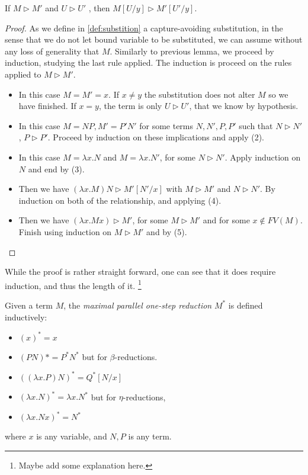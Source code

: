 \begin{lemma}If $M \triangleright M'$ and $U \triangleright U'$ , then $M [U/y] \triangleright M' [U' /y]$.
\end{lemma}
\begin{proof}
As we define in \ref{def:substition} a capture-avoiding substitution, in the sense that we do not let bound variable to be substituted, we can assume without any loss of generality that $M$. Similarly to previous lemma, we proceed by induction, studying the last rule applied. The induction is proceed on the rules applied to $M\triangleright M'$.

\begin{itemize}
    \item[(1)] In this case $M=M'=x$. If $x\ne y$ the substitution does not alter $M$ so we have finished. If $x = y$, the term is only $U\triangleright U'$, that we know by hypothesis.
    \item[(2)] In this case $M=NP, M'=P'N'$ for some terms $N,N',P,P'$ such that $N\triangleright N'$, $P\triangleright P'$. Proceed by induction on these implications and apply (2).
    \item[(3)] In this case $M=\lambda x.N$ and $M=\lambda x.N'$, for some $N\triangleright N'$. Apply induction on $N$ and end by (3).
    \item[(4)] Then we have $(\lambda x.M)N \triangleright M'[N'/x]$ with $M \triangleright M'$ and $N \triangleright N'$. By induction on both of the relationship, and applying (4).
    \item[(5)] Then we have $(\lambda x.Mx) \triangleright M'$, for some $M\triangleright M'$ and for some $x \not  \in FV(M)$. Finish using induction on $M\triangleright M'$ and by (5).
    \end{itemize}
\end{proof}

While the proof is rather straight forward, one can see that it does require induction, and thus the length of it. \footnote{Maybe add some explanation here.}

\begin{definition}
  Given a term $M$, the \emph{maximal parallel one-step reduction} $M^*$ is defined inductively:
  \begin{itemize}
  \item $(x)^*  =x$ 
  \item $(PN)*=P^*N^*$ but for $\beta$-reductions.
  \item $((\lambda x.P)N)^* = Q^*[N/x] $
  \item $(\lambda x.N)^*=\lambda x.N^*$ but for $\eta$-reductions, 
  \item $(\lambda x.Nx)^*=N^*$ 
  \end{itemize}
  where $x$ is any variable, and $N,P$ is any term.
\end{definition}


